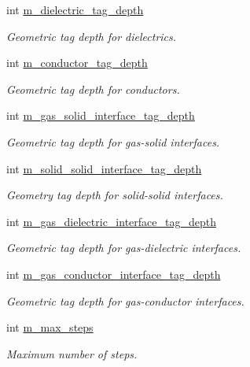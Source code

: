 \begin{DoxyCompactItemize}
int \hyperlink{classplasma__engine_abac909f41b439212638b57c8b9508278}{m\+\_\+dielectric\+\_\+tag\+\_\+depth}
\begin{DoxyCompactList}\small\item\em Geometric tag depth for dielectrics. \end{DoxyCompactList}\item 
int \hyperlink{classplasma__engine_a91e626546a2d136de4cbca5237cd80b2}{m\+\_\+conductor\+\_\+tag\+\_\+depth}
\begin{DoxyCompactList}\small\item\em Geometric tag depth for conductors. \end{DoxyCompactList}\item 
int \hyperlink{classplasma__engine_a39a131afa18a9d5eb80b02ea8ebd51bc}{m\+\_\+gas\+\_\+solid\+\_\+interface\+\_\+tag\+\_\+depth}
\begin{DoxyCompactList}\small\item\em Geometric tag depth for gas-\/solid interfaces. \end{DoxyCompactList}\item 
int \hyperlink{classplasma__engine_a646e86d966b6937ca34f9c14650ae348}{m\+\_\+solid\+\_\+solid\+\_\+interface\+\_\+tag\+\_\+depth}
\begin{DoxyCompactList}\small\item\em Geometry tag depth for solid-\/solid interfaces. \end{DoxyCompactList}\item 
int \hyperlink{classplasma__engine_af44aeef40ef6338b229d04dbb3f4287b}{m\+\_\+gas\+\_\+dielectric\+\_\+interface\+\_\+tag\+\_\+depth}
\begin{DoxyCompactList}\small\item\em Geometric tag depth for gas-\/dielectric interfaces. \end{DoxyCompactList}\item 
int \hyperlink{classplasma__engine_abc3299bed546c07295273a0196d11c3b}{m\+\_\+gas\+\_\+conductor\+\_\+interface\+\_\+tag\+\_\+depth}
\begin{DoxyCompactList}\small\item\em Geometric tag depth for gas-\/conductor interfaces. \end{DoxyCompactList}\item 
int \hyperlink{classplasma__engine_afaaa457cd8ff2b654a5331743b97d37c}{m\+\_\+max\+\_\+steps}
\begin{DoxyCompactList}\small\item\em Maximum number of steps. \end{DoxyCompactList}\item 

\end{DoxyCompactItemize}
